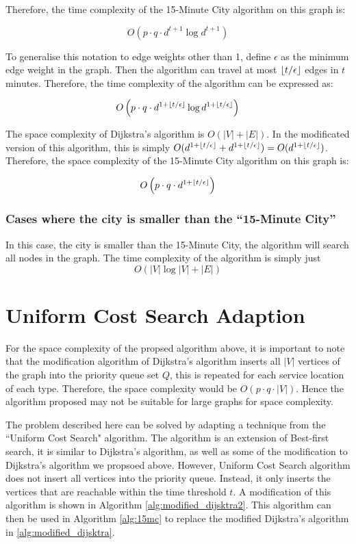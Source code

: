 Therefore, the time complexity of the 15-Minute City algorithm on this graph is:

$$O\left(p\cdot q\cdot d^{t+1}\log d^{t+1}\right)$$

To generalise this notation to edge weights other than 1, define $\epsilon$ as the minimum edge weight in the graph. Then the algorithm can travel at most $\floor*{t/\epsilon}$ edges in $t$ minutes. Therefore, the time complexity of the algorithm can be expressed as:

$$O\left(p\cdot q\cdot d^{1+\floor*{t/\epsilon}}\log d^{1+\floor*{t/\epsilon}}\right)$$

The space complexity of Dijkstra's algorithm is $O(|V|+|E|)$. In the modificated version of this algorithm, this is simply $O(d^{1+\floor*{t/\epsilon}}+d^{1+\floor*{t/\epsilon}}) = O(d^{1+\floor*{t/\epsilon}})$. Therefore, the space complexity of the 15-Minute City algorithm on this graph is:

$$O\left(p\cdot q\cdot d^{1+\floor*{t/\epsilon}}\right)$$

\subsubsection{Cases where the city is smaller than the ``15-Minute City''}

In this case, the city is smaller than the 15-Minute City, the algorithm will search all nodes in the graph. The time complexity of the algorithm is simply just $$O(|V|\log |V|+|E|)$$

\section{Uniform Cost Search Adaption}

For the space complexity of the propsed algorithm above, it is important to note that the modification algorithm of Dijkstra's algorithm inserts all $|V|$ vertices of the graph into the priority queue set $Q$, this is repeated for each service location of each type. Therefore, the space complexity would be $O(p\cdot q\cdot |V|)$. Hence the algorithm proposed may not be suitable for large graphs for space complexity.

The problem described here can be solved by adapting a technique from the ``Uniform Cost Search" algorithm. The algorithm is an extension of Best-first search, it is similar to Dijkstra's algorithm, as well as some of the modification to Dijkstra's algorithm we propsoed above. However, Uniform Cost Search algorithm does not insert all vertices into the priority queue. Instead, it only inserts the vertices that are reachable within the time threshold $t$. A modification of this algorithm is shown in Algorithm \ref{alg:modified_dijsktra2}. This algorithm can then be used in Algorithm \ref{alg:15mc} to replace the modified Dijkstra's algorithm in \ref{alg:modified_dijsktra}.

